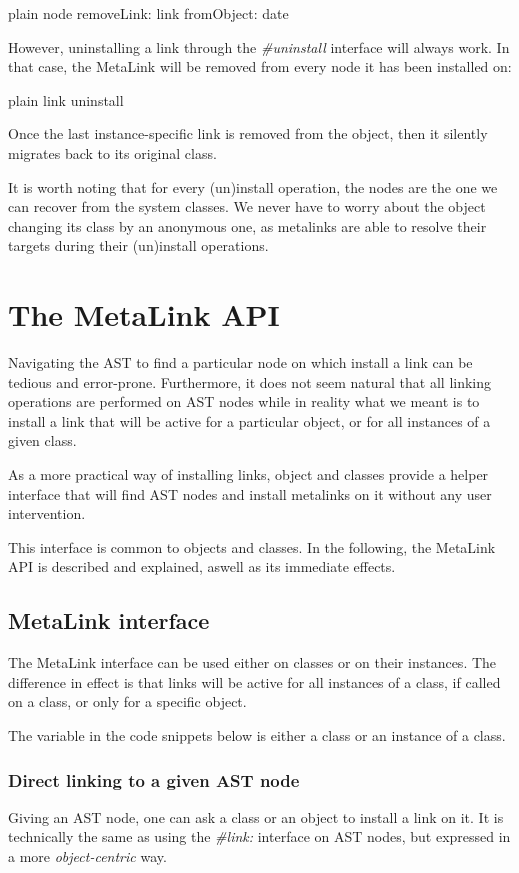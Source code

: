\documentclass[10pt,twoside,english]{_support/latex/sbabook/sbabook}
\begin{document}
\begin{displaycode}{plain}
node removeLink: link fromObject: date
\end{displaycode}

However, uninstalling a link through the \textit{\#uninstall} interface will always work. In that case, the MetaLink will be removed from every node it has been installed on:

\begin{displaycode}{plain}
link uninstall
\end{displaycode}

Once the last instance-specific link is removed from the object, then it silently migrates back to its original class.

It is worth noting that for every (un)install operation, the nodes are the one we can recover from the system classes. We never have to worry about the object changing its class by an anonymous one, as metalinks are able to resolve their targets during their (un)install operations.
\section{The MetaLink API}
Navigating the AST to find a particular node on which install a link can be tedious and error-prone. Furthermore, it does not seem natural that all linking operations are performed on AST nodes while in reality what we meant is to install a link that will be active for a particular object, or for all instances of a given class.

As a more practical way of installing links, object and classes provide a helper interface that will find AST nodes and install metalinks on it without any user intervention.

This interface is common to objects and classes. In the following, the MetaLink API is described and explained, aswell as its immediate effects.
\subsection{MetaLink interface}
The MetaLink interface can be used either on classes or on their instances. The difference in effect is that links will be active for all instances of a class, if called on a class, or only for a specific object.

The  variable in the code snippets below is either a class or an instance of a class.
\subsubsection{Direct linking to a given AST node}
Giving an AST node, one can ask a class or an object to install a link on it. It is technically the same as using the \textit{\#link:} interface on AST nodes, but expressed in a more \textit{object-centric} way.
\end{document}
